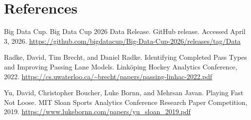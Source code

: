 \documentclass[
  10pt,
]{extarticle}
\begin{document}
\section{References}\label{references}

Big Data Cup. Big Data Cup 2026 Data Release. GitHub release. Accessed April 3, 2026. \url{https://github.com/bigdatacup/Big-Data-Cup-2026/releases/tag/Data}

Radke, David, Tim Brecht, and Daniel Radke. Identifying Completed Pass Types and Improving Passing Lane Models. Linköping Hockey Analytics Conference, 2022. \url{https://cs.uwaterloo.ca/~brecht/papers/passing-linhac-2022.pdf}

Yu, David, Christopher Boucher, Luke Bornn, and Mehrsan Javan. Playing Fast Not Loose. MIT Sloan Sports Analytics Conference Research Paper Competition, 2019. \url{https://www.lukebornn.com/papers/yu_sloan_2019.pdf}
\end{document}

